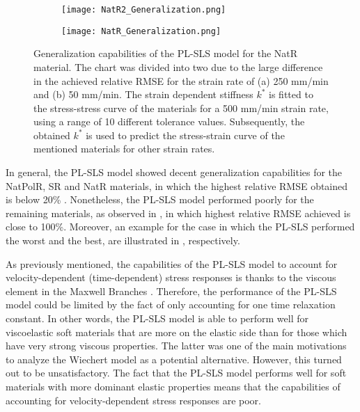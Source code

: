 \begin{figure}[htb!]
	\centering
    \begin{subfigure}[b]{0.49\textwidth}
        \centering
        \texttt{[image: NatR2\_Generalization.png]}
        \caption{}
        \label{fig:GenNatR2}
    \end{subfigure}
    \begin{subfigure}[b]{0.49\textwidth}
        \centering
        \texttt{[image: NatR\_Generalization.png]}
        \caption{}
        \label{fig:GenNatR1}
    \end{subfigure}
    \caption{Generalization capabilities of the PL-SLS model for the NatR material. The chart was divided into two due to the large difference in the achieved relative RMSE for the strain rate of (a) 250 mm/min and (b) 50 mm/min. The strain dependent stiffness $k^*$ is fitted to the stress-stress curve of the materials for a 500 mm/min strain rate, using a range of 10 different tolerance values. Subsequently, the obtained $k^*$ is used to predict the stress-strain curve of the mentioned materials for other strain rates.}
    \label{fig:GenOtherAll}
\end{figure}

In general, the PL-SLS model showed decent generalization capabilities for the NatPolR, SR and NatR materials, in which the highest relative RMSE obtained is below 20\% . Nonetheless, the PL-SLS model performed poorly for the remaining materials, as observed in , in which highest relative RMSE achieved is close to 100\%. Moreover, an example for the case in which the PL-SLS performed the worst and the best, are illustrated in , respectively.

As previously mentioned, the capabilities of the PL-SLS model to account for velocity-dependent (time-dependent) stress responses is thanks to the viscous element in the Maxwell Branches . Therefore, the performance of the PL-SLS model could be limited by the fact of only accounting for one time relaxation constant. In other words, the PL-SLS model is able to perform well for viscoelastic soft materials that are more on the elastic side than for those which have very strong viscous properties. The latter was one of the main motivations to analyze the Wiechert model as a potential alternative. However, this turned out to be unsatisfactory. The fact that the PL-SLS model performs well for soft materials with more dominant elastic properties means that the capabilities of accounting for velocity-dependent stress responses are poor.

